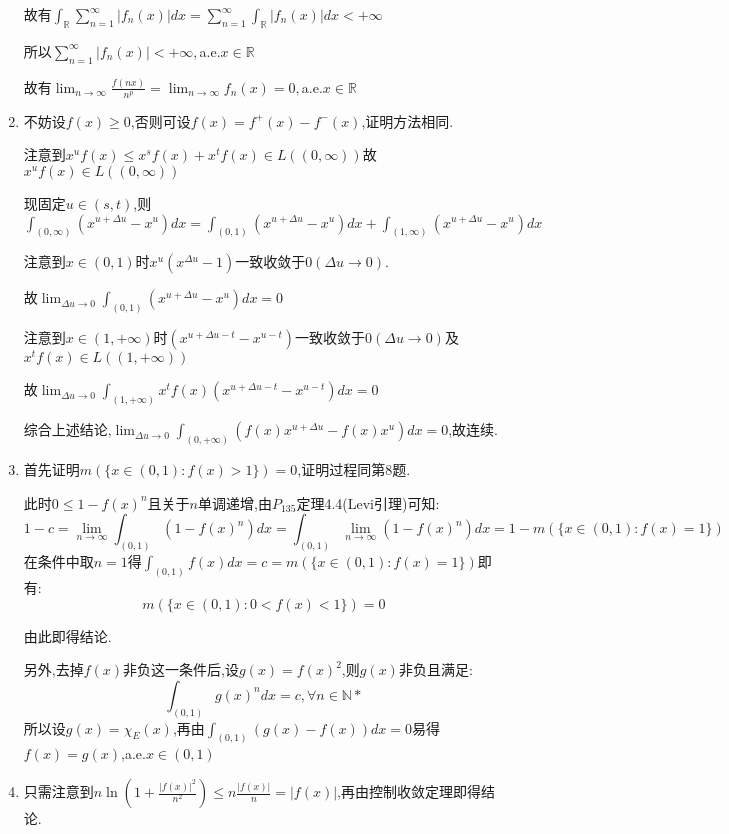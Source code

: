 \documentclass[UTF8, a4paper, 12pt, oneside, onecolumn]{article}
\numberwithin{equation}{section}
\numberwithin{figure}{section}
\numberwithin{table}{section}
\theoremstyle{nonumberplain}	%
\theoremstyle{plain}	%
\theoremstyle{plain}	%
\theoremstyle{plain}	%
\theoremstyle{plain}	%
\theoremstyle{nonumberplain}
\begin{document}
\begin{enumerate}
	故有$\displaystyle\int_{\mathbb{R}}\sum_{n=1}^{\infty}|f_n(x)|dx=\sum_{n=1}^{\infty}\int_{\mathbb{R}}|f_n(x)|dx<+\infty$
	
	所以$\displaystyle\sum_{n=1}^{\infty}|f_n(x)|<+\infty,$a.e.$x\in\mathbb{R}$
	
	故有$\displaystyle\lim_{n\rightarrow \infty}\frac{f(nx)}{n^p}=\lim_{n\rightarrow \infty}f_n(x)=0,$a.e.$x\in\mathbb{R}$
	
	\item 不妨设$f(x)\geqslant 0$,否则可设$f(x)=f^+(x)-f^-(x)$,证明方法相同.
	
	注意到$x^uf(x)\leqslant x^sf(x)+x^tf(x)\in L((0,\infty))$故$x^uf(x)\in L((0,\infty))$
	
	现固定$u\in(s,t)$,则$\displaystyle\int_{(0,\infty)}(x^{u+\Delta u}-x^u)dx=\int_{(0,1)}(x^{u+\Delta u}-x^u)dx+\int_{(1,\infty)}(x^{u+\Delta u}-x^u)dx$
	
	注意到$x\in(0,1)$时$x^u(x^{\Delta u}-1)$一致收敛于$0(\Delta u\rightarrow 0)$.
	
	故$\displaystyle\lim_{\Delta u\rightarrow 0}\int_{(0,1)}(x^{u+\Delta u}-x^u)dx=0$
	
	注意到$x\in(1,+\infty)$时$(x^{u+\Delta u-t}-x^{u-t})$一致收敛于$0(\Delta u\rightarrow 0)$及$x^tf(x)\in L((1,+\infty))$
	
	故$\displaystyle\lim_{\Delta u\rightarrow 0}\int_{(1,+\infty)}x^tf(x)(x^{u+\Delta u-t}-x^{u-t})dx=0$
	
	综合上述结论,$\displaystyle\lim_{\Delta u\rightarrow 0}\int_{(0,+\infty)}\left(f(x)x^{u+\Delta u}-f(x)x^{u}\right)dx=0$,故连续.
	
	\item 首先证明$m(\{x\in(0,1):f(x)>1\})=0$,证明过程同第8题.
	
	此时$0\leqslant1-f(x)^n$且关于$n$单调递增,由$P_{135}$定理4.4(Levi引理)可知:
	$$\displaystyle1-c=\lim_{n\rightarrow \infty}\int_{(0,1)}(1-f(x)^n)dx=\int_{(0,1)}\lim_{n\rightarrow \infty}(1-f(x)^n)dx=1-m(\{x\in(0,1):f(x)=1\})$$	
	在条件中取$n=1$得$\displaystyle\int_{(0,1)}f(x)dx=c=m(\{x\in(0,1):f(x)=1\})$即有:
	$$m(\{x\in(0,1):0<f(x)<1\})=0$$
	
	由此即得结论.
	
	另外,去掉$f(x)$非负这一条件后,设$g(x)=f(x)^2$,则$g(x)$非负且满足:
	$$\int_{(0,1)}g(x)^ndx=c,\forall n\in\mathbb{N*}$$
	所以设$g(x)=\chi_E(x)$,再由$\int_{(0,1)}(g(x)-f(x))dx=0 $易得$f(x)=g(x)$,a.e.$x\in(0,1)$
	
	\item 只需注意到$\displaystyle n\ln(1+\frac{|f(x)|^2}{n^2})\leqslant n\frac{|f(x)|}{n}=|f(x)|$,再由控制收敛定理即得结论.
	

\end{enumerate}
\end{document}
